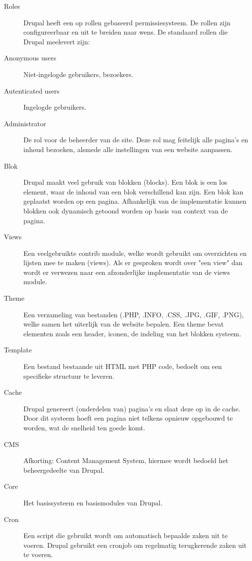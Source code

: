 \begin{description}
\item[Roles] Drupal heeft een op rollen gebaseerd permissiesysteem. De rollen zijn configureerbaar en uit te breiden naar wens. 
De standaard rollen die Drupal meelevert zijn:

\item[Anonymous users] Niet-ingelogde gebruikers, bezoekers.
\item[Autenticated users] Ingelogde gebruikers.
\item[Administrator] De rol voor de beheerder van de site. Deze rol mag feitelijk alle pagina's en inhoud bezoeken, alsmede alle instellingen van een website aanpassen. 

\item[Blok] Drupal maakt veel gebruik van blokken (blocks). Een blok is een los element, waar de inhoud van een blok verschillend kan zijn. Een blok kan geplaatst worden op een pagina. Afhankelijk van de implementatie kunnen blokken ook dynamisch getoond worden op basis van context van de pagina. 

\item[Views] Een veelgebruikte contrib module, welke wordt gebruikt om overzichten en lijsten mee te maken (views). Als er gesproken wordt over "een view" dan wordt er verwezen naar een afzonderlijke implementatie van de views module. 

\item[Theme] Een verzameling van bestanden (.PHP, .INFO, .CSS, .JPG, .GIF, .PNG), welke samen het uiterlijk van de website bepalen. Een theme bevat elementen zoals een header, iconen, de indeling van het blokken systeem. 

\item[Template] Een bestand bestaande uit HTML met PHP code, bedoelt om een specifieke structuur te leveren. 

\item[Cache] Drupal genereert (onderdelen van) pagina's en slaat deze op in de cache. Door dit systeem hoeft een pagina niet telkens opnieuw opgebouwd te worden, wat de snelheid ten goede komt. 

\item[CMS] Afkorting: Content Management System, hiermee wordt bedoeld het beheergedeelte van Drupal. 

\item[Core] Het basissysteem en basismodules van Drupal. 

\item[Cron] Een script die gebruikt wordt om automatisch bepaalde zaken uit te voeren. Drupal gebruikt een cronjob om regelmatig terugkerende zaken uit te voeren. 


\end{description}
